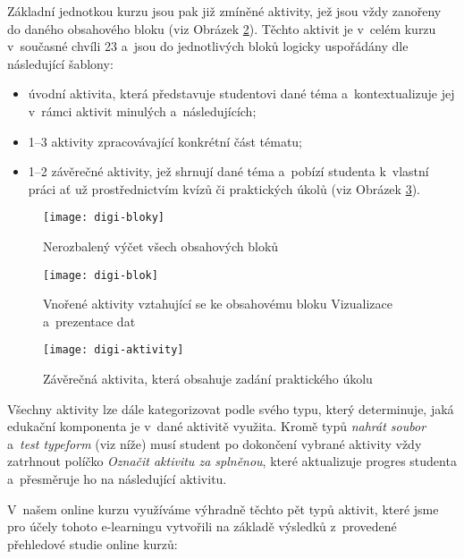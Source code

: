 Základní jednotkou kurzu jsou pak již zmíněné aktivity, jež jsou vždy zanořeny do daného obsahového bloku (viz Obrázek \ref{digi-blok}). Těchto aktivit je v~celém kurzu v~současné chvíli 23 a~jsou do jednotlivých bloků logicky uspořádány dle následující šablony:

\begin{itemize}
\tightlist
\item
  úvodní aktivita, která představuje studentovi dané téma a~kontextualizuje jej v~rámci aktivit minulých a~následujících;
\item
  1--3 aktivity zpracovávající konkrétní část tématu;
\item
  1--2 závěrečné aktivity, jež shrnují dané téma a~pobízí studenta k~vlastní práci ať už prostřednictvím kvízů či praktických úkolů (viz Obrázek \ref{digi-aktivity}).
\end{itemize}

\begin{figure}[h]   
    \centering
    \texttt{[image: digi-bloky]}  
    \caption{Nerozbalený výčet všech obsahových bloků}
    \label{digi-bloky}
\end{figure}

\begin{figure}[h]   
    \centering
    \texttt{[image: digi-blok]}  
    \caption{Vnořené aktivity vztahující se ke obsahovému bloku Vizualizace a~prezentace dat}
    \label{digi-blok}
\end{figure}

\begin{figure}[h]   
    \centering
    \texttt{[image: digi-aktivity]}  
    \caption{Závěrečná aktivita, která obsahuje zadání praktického úkolu}
    \label{digi-aktivity}
\end{figure}

Všechny aktivity lze dále kategorizovat podle svého typu, který determinuje, jaká edukační komponenta je v~dané aktivitě využita. Kromě typů \emph{nahrát soubor} a~\emph{test typeform} (viz níže) musí student po dokončení vybrané aktivity vždy zatrhnout políčko \emph{Označit aktivitu za splněnou}, které aktualizuje progres studenta a~přesměruje ho na následující aktivitu.

V~našem online kurzu využíváme výhradně těchto pět typů aktivit, které jsme pro účely tohoto e-learningu vytvořili na základě výsledků z~provedené přehledové studie online kurzů:

